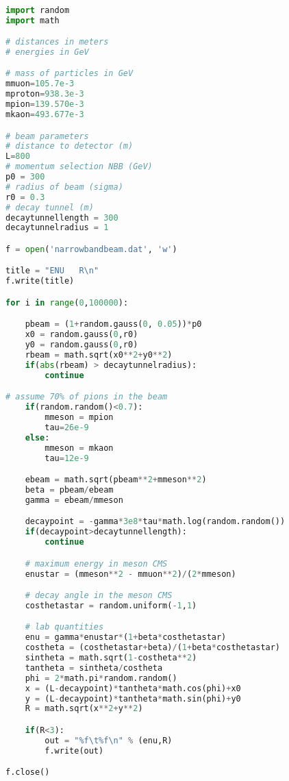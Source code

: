 \documentclass[a4paper,10pt]{article}
\begin{document}
\begin{lstlisting}[language=Python]

import random
import math

# distances in meters
# energies in GeV

# mass of particles in GeV
mmuon=105.7e-3
mproton=938.3e-3
mpion=139.570e-3
mkaon=493.677e-3

# beam parameters
# distance to detector (m)
L=800
# momentum selection NBB (GeV)
p0 = 300
# radius of beam (sigma)
r0 = 0.3
# decay tunnel (m)
decaytunnellength = 300
decaytunnelradius = 1

f = open('narrowbandbeam.dat', 'w')

title = "ENU   R\n"
f.write(title)

for i in range(0,100000):

    pbeam = (1+random.gauss(0, 0.05))*p0
    x0 = random.gauss(0,r0)
    y0 = random.gauss(0,r0)
    rbeam = math.sqrt(x0**2+y0**2)
    if(abs(rbeam) > decaytunnelradius):
        continue

# assume 70% of pions in the beam
    if(random.random()<0.7):
        mmeson = mpion
        tau=26e-9
    else:
        mmeson = mkaon
        tau=12e-9

    ebeam = math.sqrt(pbeam**2+mmeson**2)
    beta = pbeam/ebeam
    gamma = ebeam/mmeson

    decaypoint = -gamma*3e8*tau*math.log(random.random())
    if(decaypoint>decaytunnellength):
        continue

    # maximum energy in meson CMS
    enustar = (mmeson**2 - mmuon**2)/(2*mmeson)

    # decay angle in the meson CMS
    costhetastar = random.uniform(-1,1)

    # lab quantities
    enu = gamma*enustar*(1+beta*costhetastar)
    costheta = (costhetastar+beta)/(1+beta*costhetastar)
    sintheta = math.sqrt(1-costheta**2)
    tantheta = sintheta/costheta
    phi = 2*math.pi*random.random()
    x = (L-decaypoint)*tantheta*math.cos(phi)+x0
    y = (L-decaypoint)*tantheta*math.sin(phi)+y0
    R = math.sqrt(x**2+y**2)

    if(R<3):
        out = "%f\t%f\n" % (enu,R)
        f.write(out)

f.close()

\end{lstlisting}
\end{document}
